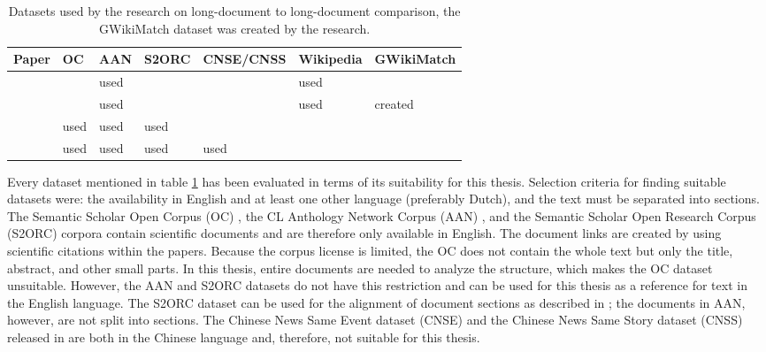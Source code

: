\begin{table}[h!tbp]
    \centering
    \begin{tabular}{l|l|l|l|l|l|l}
    	\textbf{Paper} &  \textbf{OC} & \textbf{AAN}  
    	& \textbf{S2ORC}  & \textbf{CNSE/CNSS} & \textbf{Wikipedia} & \textbf{GWikiMatch}  \\
		\hline
        \citet{jiang2019semantic} & & used & & & used &   \\
		\hline
        \citet{512Tokens} & & used & &  & used & created   \\
		\hline
        \cite{zhou2020multilevel} & used & used & used &  &  &    \\ 
		\hline
        \citet{Pang2021}& used & used & used & used &  \\ 
		\hline
    \end{tabular}
    \caption{Datasets used by the research on long-document to long-document comparison, the GWikiMatch dataset was created by the research.}
  	\label{tabDatasets}
\end{table}


Every dataset mentioned in table \ref{tabDatasets} has been evaluated in terms of its suitability for this thesis. Selection criteria for finding suitable datasets were: the availability in English and at least one other language (preferably Dutch), and the text must be separated into sections.\\

 The Semantic Scholar Open Corpus (OC) \citep{Bhagavatula2018}, the CL Anthology Network Corpus (AAN) \citep{radev}, and the Semantic Scholar Open Research Corpus (S2ORC) \citep{lo2019} corpora contain scientific documents and are therefore only available in English. The document links are created by using scientific citations within the papers. Because the corpus license is limited, the OC does not contain the whole text but only the title, abstract, and other small parts. In this thesis, entire documents are needed to analyze the structure, which makes the OC dataset unsuitable. However, the AAN and S2ORC datasets do not have this restriction and can be used for this thesis as a reference for text in the English language. The S2ORC dataset can be used for the alignment of document sections as described in \citet{zhou2020multilevel}; the documents in AAN, however, are not split into sections. The Chinese News Same Event dataset (CNSE) and the Chinese News Same Story dataset (CNSS) released in \citet{Liu2019} are both in the Chinese language and, therefore, not suitable for this thesis. \\

